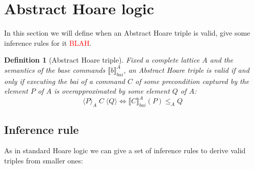 \documentclass{article}
\newtheorem{definition}{Definition}
\newcommand\todo[1]{\textcolor{red}{#1}}
\newcommand{\atriple}[4][A]{
    \langle #2 \rangle_#1 \; #3 \; \langle #4 \rangle
}
\newcommand*{\sem}[1]{
    \llbracket #1 \rrbracket
}
\newcommand{\bca}[2]{
    #2_{bai}^{#1}
}
\newcommand{\bsem}[2][A]{
    \bca{#1}{\sem{#2}}
}
\begin{document}
\section{Abstract Hoare logic}
    In this section we will define when an Abstract Hoare triple is valid, give
    some inference rules for it \todo{BLAH}.

    \begin{definition}[Abstract Hoare triple]
        Fixed a complete lattice $A$ and the semantics of the base commands 
        $\bsem{b}$, an \textit{Abstract Hoare triple} is valid if and only if 
        executing the bai of a command $C$ of some precondition captured by the
        element $P$ of $A$ is overapproximated by some element $Q$ of $A$:
        $$\atriple{P}{C}{Q} \iff \bsem{C}(P) \leq_A Q$$
    \end{definition}

\subsection{Inference rule}
    As in standard Hoare logic we can give a set of inference rules to derive
    valid triples from smaller ones:
\end{document}
